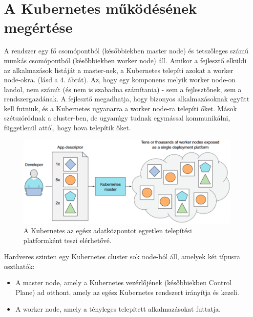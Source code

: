 \section{A Kubernetes működésének megértése}
A rendszer egy fő csomópontból (későbbiekben master node) és tetszőleges számú munkás csomópontból (későbbiekben worker node) áll. Amikor a fejlesztő elküldi az alkalmazások listáját a master-nek, a Kubernetes telepíti azokat a worker node-okra. (lásd a 4. ábrát). Az, hogy egy komponens melyik worker node-on landol, nem számít (és nem is szabadna számítania) - sem a fejlesztőnek, sem a rendszergazdának. A fejlesztő megadhatja, hogy bizonyos alkalmazásoknak együtt kell futniuk, és a Kubernetes ugyanarra a worker node-ra telepíti őket. Mások szétszóródnak a cluster-ben, de ugyanúgy tudnak egymással kommunikálni, függetlenül attól, hogy hova telepítik őket.
\cite{Marko17}
\begin{figure}[ht]
    \centering
         \includegraphics[width=1.0\textwidth]{figures/kubernetes/kubernetes-overview.png}
          \caption{A Kubernetes az egész adatközpontot egyetlen telepítési platformként teszi elérhetővé. \cite{Marko17}}
           \label{kubernetes-overview}
\end{figure}

Hardveres szinten egy Kubernetes cluster sok node-ból áll, amelyek két típusra oszthatók:
\begin{itemize}
    \item A master node, amely a Kubernetes vezérlőjének (későbbiekben Control Plane) ad otthont, amely az egész Kubernetes rendszert irányítja és kezeli.
    \item A worker node, amely a tényleges telepített alkalmazásokat futtatja.
\end{itemize}

